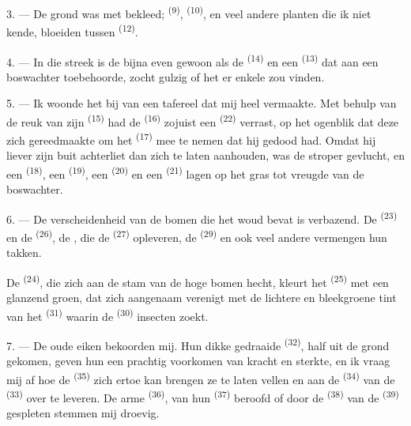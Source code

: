 3. --- De grond was met  bekleed; 
\textsuperscript{(9)},  \textsuperscript{(10)}, en veel andere planten die
ik niet kende, bloeiden tussen  \textsuperscript{(12)}.

4. --- In die streek is de  bijna even gewoon als de
 \textsuperscript{(14)} en een 
\textsuperscript{(13)} dat aan een boswachter toebehoorde, zocht gulzig of het er enkele zou
vinden.

\VUsaut{3.0mm}
\VUsaut{3.0mm}

5. --- Ik woonde het  bij van een tafereel dat mij heel vermaakte. Met behulp
van de reuk van zijn  \textsuperscript{(15)} had de
 \textsuperscript{(16)} zojuist een 
\textsuperscript{(22)} verrast, op het ogenblik dat deze zich gereedmaakte om het
 \textsuperscript{(17)} mee te nemen dat hij gedood had. Omdat hij
liever zijn buit achterliet dan zich te laten aanhouden, was de stroper gevlucht, en een
 \textsuperscript{(18)}, een  \textsuperscript{(19)}, een
 \textsuperscript{(20)} en een
 \textsuperscript{(21)} lagen op het gras tot vreugde van de
boswachter.

6. --- De verscheidenheid van de bomen die het woud bevat is verbazend. De
 \textsuperscript{(23)} en de 
\textsuperscript{(26)}, de , die de  \textsuperscript{(27)}
opleveren, de  \textsuperscript{(29)} en ook veel andere vermengen hun takken.

De  \textsuperscript{(24)}, die zich aan de stam van de hoge bomen hecht,
kleurt het  \textsuperscript{(25)} met een glanzend groen, dat zich aangenaam
verenigt met de lichtere en bleekgroene tint van het
 \textsuperscript{(31)} waarin de 
\textsuperscript{(30)} insecten zoekt.

\VUsaut{3.0mm}
\VUsaut{3.0mm}

7. --- De oude eiken bekoorden mij. Hun dikke gedraaide 
\textsuperscript{(32)}, half uit de grond gekomen, geven hun een prachtig voorkomen van kracht
en sterkte, en ik vraag mij af hoe de  \textsuperscript{(35)} zich ertoe kan
brengen ze te laten vellen en aan de
 \textsuperscript{(34)} van de 
\textsuperscript{(33)} over te leveren. De arme  \textsuperscript{(36)}, van
hun  \textsuperscript{(37)} beroofd of door de 
\textsuperscript{(38)} van de  \textsuperscript{(39)} gespleten stemmen mij
droevig.


